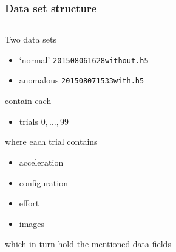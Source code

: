 \documentclass{beamer}
\begin{document}
    \begin{frame}
    	\frametitle{Data set structure}
        \begin{columns}[onlytextwidth]
            \begin{column}{.6\textwidth}
                Two data sets
                \begin{itemize}
                    \item `normal' \texttt{201508061628without.h5}
                    \item anomalous \texttt{201508071533with.h5}
                \end{itemize}
                contain each
                \begin{itemize}
                    \item trials $0, \ldots, 99$
                \end{itemize}
                where each trial contains
                \begin{itemize}
                    \item acceleration
                    \item configuration
                    \item effort
                    \item images
                \end{itemize}
                which in turn hold the mentioned data fields
            \end{column}
            \begin{column}{.4\textwidth}
                \begin{figure}
                    \centering

\end{figure}
\end{column}
\end{columns}
\end{frame}
\end{document}
